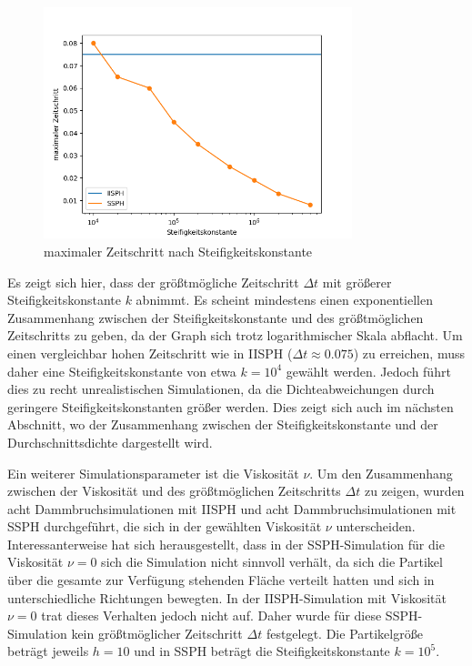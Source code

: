 \documentclass{scrreprt}
\begin{document}
\begin{figure}[htb]
    \includegraphics[width=0.8\textwidth]{stiffness_timestep.png}
    \caption{maximaler Zeitschritt nach Steifigkeitskonstante}
    \label{image:stiffness_timestep}
\end{figure}

Es zeigt sich hier, dass der größtmögliche Zeitschritt $\Delta t$ mit größerer Steifigkeitskonstante $k$ abnimmt.
Es scheint mindestens einen exponentiellen Zusammenhang zwischen der Steifigkeitskonstante und des größtmöglichen Zeitschritts zu geben,
da der Graph sich trotz logarithmischer Skala abflacht.
Um einen vergleichbar hohen Zeitschritt wie in IISPH ($\Delta t \approx 0.075$) zu erreichen, muss daher eine Steifigkeitskonstante von etwa $k = 10^4$ gewählt werden.
Jedoch führt dies zu recht unrealistischen Simulationen, da die Dichteabweichungen durch geringere Steifigkeitskonstanten größer werden.
Dies zeigt sich auch im nächsten Abschnitt, wo der Zusammenhang zwischen der Steifigkeitskonstante und der Durchschnittsdichte dargestellt wird.

Ein weiterer Simulationsparameter ist die Viskosität $\nu$.
Um den Zusammenhang zwischen der Viskosität und des größtmöglichen Zeitschritts $\Delta t$ zu zeigen,
wurden acht Dammbruchsimulationen mit IISPH und acht Dammbruchsimulationen mit SSPH durchgeführt, die sich in der gewählten Viskosität $\nu$ unterscheiden.
Interessanterweise hat sich herausgestellt, dass in der SSPH-Simulation für die Viskosität $\nu = 0$ sich die Simulation nicht sinnvoll verhält,
da sich die Partikel über die gesamte zur Verfügung stehenden Fläche verteilt hatten und sich in unterschiedliche Richtungen bewegten.
In der IISPH-Simulation mit Viskosität $\nu = 0$ trat dieses Verhalten jedoch nicht auf.
Daher wurde für diese SSPH-Simulation kein größtmöglicher Zeitschritt $\Delta t$ festgelegt.
Die Partikelgröße beträgt jeweils $h = 10$ und in SSPH beträgt die Steifigkeitskonstante $k = 10^5$.
\end{document}
